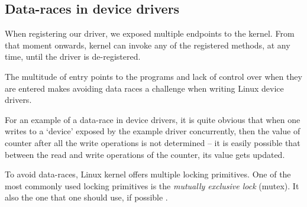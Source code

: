 \documentclass[..thesis.tex]{subfiles}
\begin{document}

 

\subsection{Data-races in device drivers}


When registering our driver, we exposed multiple endpoints to the kernel. From that moment onwards, kernel can invoke any of the registered methods, at any time, until the driver is de-registered. 


The multitude of entry points to the programs and lack of control over when they are entered makes avoiding data races a challenge when writing Linux device drivers. 

For an example of a data-race in device drivers, it is quite obvious that when one writes to a `device' exposed by the example driver concurrently, then the value of counter after all the write operations is not determined -- it is easily possible that between the read and write operations of the counter, its value gets updated.




To avoid data-races, Linux kernel offers multiple locking primitives. One of the most commonly used locking primitives is the \textit{mutually exclusive lock} (mutex). It also the one that one should use, if possible \cite[Documentation/locking/mutex-design.txt]{torvalds_linux}.
\end{document}
